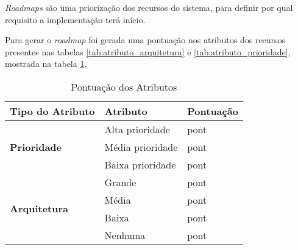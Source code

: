 
\textit{Roadmaps} são uma priorização dos recursos do sistema, para definir por qual requisito a implementação terá início.

Para gerar o \textit{roadmap} foi gerada uma pontuação nos atributos dos recursos presentes nas tabelas \ref{tab:atributo_arquitetura} e \ref{tab:atributo_prioridade}, mostrada na tabela \ref{tab:pontuacao_atributos}.

\begin{table}[H]
\centering
\begin{tabular}{|p{2cm}|p{5cm}|p{3cm}|}

\hline
\textbf{Tipo do Atributo} &
\textbf{Atributo} &
\textbf{Pontuação}
\\ \hline

\multirow{3}{*}{
\textbf{Prioridade}} &
	Alta prioridade &
	pont
	\\ \cline{2-3} &
	Média prioridade  &
	pont
	\\ \cline{2-3} &
	Baixa prioridade  &
	pont
	\\ \hline

\multirow{4}{*}{\textbf{Arquitetura}} &
	Grande &
	pont
	\\ \cline{2-3} &
	Média &
	pont
	\\ \cline{2-3} &
	Baixa &
	pont
	\\ \cline{2-3} &
	Nenhuma &
	pont
	\\ \hline
\end{tabular}
\caption{Pontuação dos Atributos}
\label{tab:pontuacao_atributos}
\end{table}